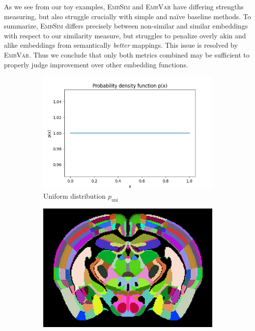 \documentclass[]{article}
\begin{document}
As we see from our toy examples, \textsc{EmbSim} and \textsc{EmbVar} have differing strengths measuring, but also struggle crucially with simple and na\"ive baseline methods. To summarize, \textsc{EmbSim} differs precisely between non-similar and similar embeddings with respect to our similarity measure, but struggles to penalize overly akin and alike embeddings from semantically \textit{better} mappings. This issue is resolved by \textsc{EmbVar}. Thus we conclude that only both metrics combined may be sufficient to properly judge improvement over other embedding functions.

\begin{figure}
		
	\begin{subfigure}{0.3\textwidth}
		\centering
		\includegraphics[width=1.1\linewidth]{plotted_figures/random_density_function.png}
		\caption{Uniform distribution $p_\text{uni}$}
		\label{fig:random_distribution}
	\end{subfigure}
	\begin{subfigure}{0.3\textwidth}
		\centering
		\includegraphics[width=0.95\linewidth]{../results/random_ano_coronal_50_res_slice_1.png}

\end{subfigure}
\end{figure}
\end{document}
